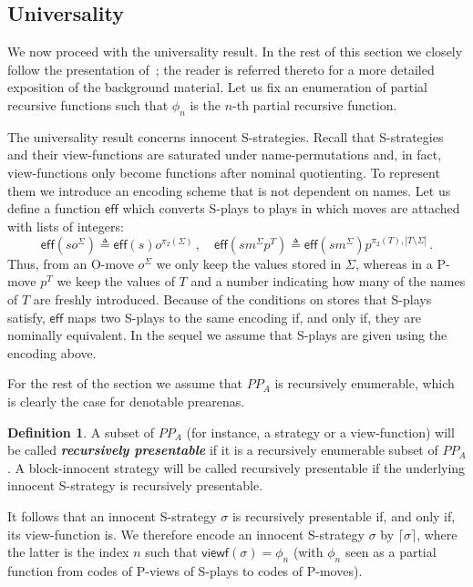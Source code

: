 \documentclass{CSML}
\theoremstyle{definition}\newtheorem{definition}[thm]{Definition}
\theoremstyle{definition}\newtheorem{example}[thm]{Example}
\theoremstyle{definition}\newtheorem{proposition}[thm]{Proposition}
\theoremstyle{definition}\newtheorem{lemma}[thm]{Lemma}
\theoremstyle{definition}\newtheorem{theorem}[thm]{Theorem}
\theoremstyle{definition}\newtheorem{corollary}[thm]{Corollary}
\theoremstyle{definition}\newtheorem{remark}[thm]{Remark}
\newcommand\nt[1]{#1}
\renewcommand\Sigma{\varSigma}
\newcommand\Tau{T}
\newcommand\defn{\triangleq}
\newcommand\remv{\setminus}
\newcommand\code[1]{\lceil#1\rceil}
\newcommand\viewf{\mathsf{viewf}}
\newcommand\preplays[1]{\mathit{PP}_{#1}}
\newcommand\boldemph[1]{\emph{\textbf{#1}}}
\newcommand\iacbv{\mathsf{IA}_{\mathsf{cbv}}}
\newcommand\cutout[1]{}
\newcommand\eff{\mathsf{eff}}
\begin{document}
\cutout{
\begin{proposition}[Finitary Definability and Universality]
\begin{asparaitem}
\item Any finitary innocent S-strategy
is $\iacbv$-definable.
\item Any recursively presentable innocent S-strategy is $\iacbv$-definable.
\end{asparaitem}
\end{proposition}}

\subsection{Universality}

We now proceed with the universality result.
In the rest of this section we closely follow the presentation of~\cite{AJM00}; the reader is referred thereto for a more detailed exposition of the background material.
Let us fix an enumeration of partial recursive functions such that $\phi_n$ is the $n$-th partial recursive function. 

The universality result concerns innocent S-strategies. Recall that S-strategies and their view-functions are saturated under name-permutations and, in fact, view-functions only become functions after nominal quotienting. To represent them we introduce an encoding scheme that is not dependent on names. 
Let us define a function $\eff$ which converts S-plays to plays in which moves are attached with lists of integers:
\[ 
\eff(so^\Sigma)\defn\eff(s)o^{\pi_2(\Sigma)}\,,\quad\eff(sm^\Sigma p^\Tau)\defn\eff(sm^\Sigma)p^{\pi_2(\Tau),|\Tau\remv\Sigma|}\,. 
\]
Thus, from an O-move $o^\Sigma$ we only keep the values stored in $\Sigma$, whereas in a P-move $p^\Tau$ we keep the values of $\Tau$ and a number indicating how many of the names of $\Tau$ are freshly introduced. Because of the conditions on stores that S-plays satisfy, $\eff$ maps two S-plays to the same encoding if, and only if, they are nominally equivalent. 
In the sequel we assume that S-plays are given using the encoding above.

For the rest of the section we assume that \nt{$\preplays{A}$} is recursively enumerable, which is clearly the case for denotable prearenas.

\begin{definition}
A subset of \nt{$\preplays{A}$} (for instance, a strategy or a view-function)
will be called \boldemph{recursively presentable} if it is a recursively enumerable subset of \nt{$\preplays{A}$}. A block-innocent strategy will be called  recursively presentable if the underlying
innocent S-strategy is recursively presentable.
\end{definition}
It follows that an innocent S-strategy $\sigma$ is recursively presentable if, and only if, its view-function is.
We therefore encode an innocent S-strategy $\sigma$ by $\code{\sigma}$, where the latter is the index $n$ such that $\viewf(\sigma)=\phi_n$ (with $\phi_n$ seen as a partial function from codes of P-views of S-plays to codes of P-moves).
\end{document}
